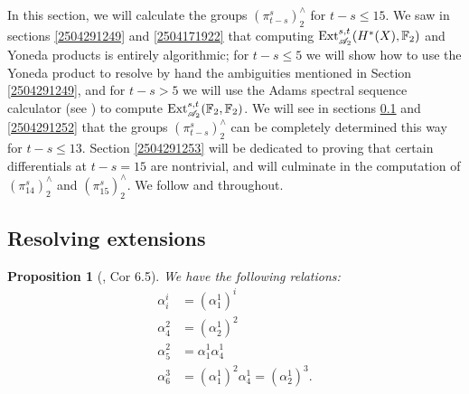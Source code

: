 \documentclass[11pt, titlepage]{article} %
\def\bb{\ensuremath\mathbb}
\def\A{\ensuremath{\mathscr{A}_2}}
\DeclareMathOperator{\Ext}{Ext}
\numberwithin{equation}{subsection}
\theoremstyle{plain}
\newtheorem{proposition}[theorem]{Proposition}
\theoremstyle{definition}
\begin{document}
In this section, we will calculate the groups \((\pi_{t-s}^s)^\wedge_2\) for \(t-s\leq 15\). We saw in sections \ref{2504291249} and  \ref{2504171922} that computing \(\Ext^{s,t}_{\A}(H^*(X), \bb{F}_2)\) and Yoneda products is entirely algorithmic; for \(t-s\leq 5\) we will show how to use the Yoneda product to resolve by hand the ambiguities mentioned in Section \ref{2504291249}, and for \(t-s > 5\) we will use the Adams spectral sequence calculator (see \autocite{sseq}) to compute \(\Ext^{s,t}_{\A}(\bb{F}_2, \bb{F}_2)\). We will see in sections \ref{2504291251} and \ref{2504291252} that the groups \((\pi_{t-s}^s)^\wedge_2\) can be completely determined this way for \(t-s \leq 13\). Section \ref{2504291253} will be dedicated to proving that certain differentials at \(t-s=15\) are nontrivial, and will culminate in the computation of \((\pi_{14}^s)^\wedge_2\) and \((\pi_{15}^s)^\wedge_2\). We follow \autocite{ass} and \autocite{rognes2} throughout. 

\subsection{Resolving extensions}\label{2504291251}

\begin{proposition}[{\autocite{ass}, Cor 6.5}]
We have the following relations:
\begin{align*}
\alpha^i_i &= (\alpha_1^1)^i\\
\alpha_4^2&=(\alpha^1_2)^2\\
\alpha^2_5&=\alpha^1_1 \alpha^1_4\\
\alpha^3_6&=(\alpha^1_1)^2 \alpha_4^1=(\alpha^1_2)^3.
\end{align*}
\end{proposition}
\end{document}
